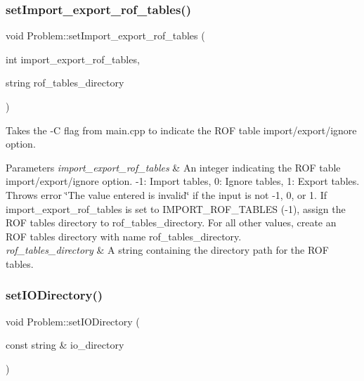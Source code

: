 \subsubsection{\texorpdfstring{set\+Import\+\_\+export\+\_\+rof\+\_\+tables()}{setImport\_export\_rof\_tables()}}
{\footnotesize\ttfamily void Problem\+::set\+Import\+\_\+export\+\_\+rof\+\_\+tables (\begin{DoxyParamCaption}\item[{int}]{import\+\_\+export\+\_\+rof\+\_\+tables,  }\item[{string}]{rof\+\_\+tables\+\_\+directory }\end{DoxyParamCaption})}



Takes the -\/C flag from main.\+cpp to indicate the R\+OF table import/export/ignore option. 


\begin{DoxyParams}{Parameters}
{\em import\+\_\+export\+\_\+rof\+\_\+tables} & An integer indicating the R\+OF table import/export/ignore option. -\/1\+: Import tables, 0\+: Ignore tables, 1\+: Export tables. Throws error \char`\"{}\+The value entered is invalid\char`\"{} if the input is not -\/1, 0, or 1. If import\+\_\+export\+\_\+rof\+\_\+tables is set to I\+M\+P\+O\+R\+T\+\_\+\+R\+O\+F\+\_\+\+T\+A\+B\+L\+ES (-\/1), assign the R\+OF tables directory to rof\+\_\+tables\+\_\+directory. For all other values, create an R\+OF tables directory with name rof\+\_\+tables\+\_\+directory. \\
\hline
{\em rof\+\_\+tables\+\_\+directory} & A string containing the directory path for the R\+OF tables. \\
\hline
\end{DoxyParams}
\mbox{\label{classProblem_a188254a95b04bf4ed67e66262ea342e9}} 
\subsubsection{\texorpdfstring{set\+I\+O\+Directory()}{setIODirectory()}}
{\footnotesize\ttfamily void Problem\+::set\+I\+O\+Directory (\begin{DoxyParamCaption}\item[{const string \&}]{io\+\_\+directory }\end{DoxyParamCaption})}



